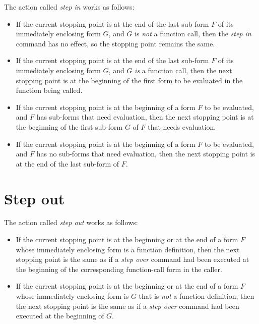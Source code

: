 The action called \emph{step in} works as follows:

\begin{itemize}
\item If the current stopping point is at the end of the last sub-form
  $F$ of its immediately enclosing form $G$, and $G$ is \emph{not} a
  function call, then the \emph{step in} command has no effect, so the
  stopping point remains the same.
\item If the current stopping point is at the end of the last sub-form
  $F$ of its immediately enclosing form $G$, and $G$ \emph{is} a
  function call, then the next stopping point is at the beginning of
  the first form to be evaluated in the function being called.
\item If the current stopping point is at the beginning of a form $F$
  to be evaluated, and $F$ has sub-forms that need evaluation, then
  the next stopping point is at the beginning of the first sub-form
  $G$ of $F$ that needs evaluation.
\item If the current stopping point is at the beginning of a form $F$
  to be evaluated, and $F$ has no sub-forms that need evaluation, then
  the next stopping point is at the end of the last sub-form of $F$.
\end{itemize}

\section{Step out}

The action called \emph{step out} works as follows:

\begin{itemize}
\item If the current stopping point is at the beginning or at the end
  of a form $F$ whose immediately enclosing form is a function
  definition, then the next stopping point is the same as if a
  \emph{step over} command had been executed at the beginning of the
  corresponding function-call form in the caller.
\item If the current stopping point is at the beginning or at the end
  of a form $F$ whose immediately enclosing form is $G$ that is
  \emph{not} a function definition, then the next stopping point is
  the same as if a \emph{step over} command had been executed at the
  beginning of $G$.
\end{itemize}

